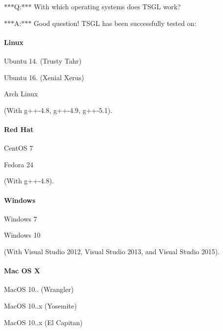 $\ast$$\ast$$\ast$\-Q\-:$\ast$$\ast$$\ast$ With which operating systems does T\-S\-G\-L work?

$\ast$$\ast$$\ast$\-A\-:$\ast$$\ast$$\ast$ Good question! T\-S\-G\-L has been successfully tested on\-:

\paragraph*{Linux}


\begin{DoxyItemize}
\item Ubuntu 14. (Trusty Tahr)
\item Ubuntu 16. (Xenial Xerus)
\item Arch Linux
\end{DoxyItemize}

(With g++-\/4.8, g++-\/4.9, g++-\/5.1).

\paragraph*{Red Hat}


\begin{DoxyItemize}
\item Cent\-O\-S 7
\item Fedora 24
\end{DoxyItemize}

(With g++-\/4.8).

\paragraph*{Windows}


\begin{DoxyItemize}
\item Windows 7
\item Windows 10
\end{DoxyItemize}

(With Visual Studio 2012, Visual Studio 2013, and Visual Studio 2015).

\paragraph*{Mac O\-S X}


\begin{DoxyItemize}
\item Mac\-O\-S 10.. (Wrangler)
\item Mac\-O\-S 10..\-x (Yosemite)
\item Mac\-O\-S 10..\-x (El Capitan)
\end{DoxyItemize}

